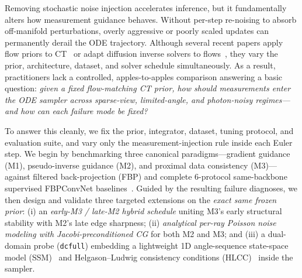 \documentclass[11pt]{article}
\begin{document}
Removing stochastic noise injection accelerates inference, but it fundamentally alters how measurement guidance behaves. Without per-step re-noising to absorb off-manifold perturbations, overly aggressive or poorly scaled updates can permanently derail the ODE trajectory. Although several recent papers apply flow priors to CT~\cite{evangelista2026pgfm,eFMCT2026,lucid2026} or adapt diffusion inverse solvers to flows~\cite{pokle2024otode,martin2025pnpflow,kim2025flowdps}, they vary the prior, architecture, dataset, and solver schedule simultaneously. As a result, practitioners lack a controlled, apples-to-apples comparison answering a basic question: \emph{given a fixed flow-matching CT prior, how should measurements enter the ODE sampler across sparse-view, limited-angle, and photon-noisy regimes---and how can each failure mode be fixed?}

To answer this cleanly, we fix the prior, integrator, dataset, tuning protocol, and evaluation suite, and vary only the measurement-injection rule inside each Euler step. We begin by benchmarking three canonical paradigms---gradient guidance (M1), pseudo-inverse guidance (M2), and proximal data consistency (M3)---against filtered back-projection (FBP) and complete 6-protocol same-backbone supervised FBPConvNet baselines~\cite{jin2017fbpconvnet}. Guided by the resulting failure diagnoses, we then design and validate three targeted extensions on the \emph{exact same frozen prior}: (i) an \emph{early-M3 / late-M2 hybrid schedule} uniting M3's early structural stability with M2's late edge sharpness; (ii) \emph{analytical per-ray Poisson noise modeling with Jacobi-preconditioned CG} for both M2 and M3; and (iii) a dual-domain probe (\texttt{dcfull}) embedding a lightweight 1D angle-sequence state-space model (SSM)~\cite{gu2024mamba} and Helgason--Ludwig consistency conditions (HLCC)~\cite{helgason1999radon} inside the sampler.
\end{document}
